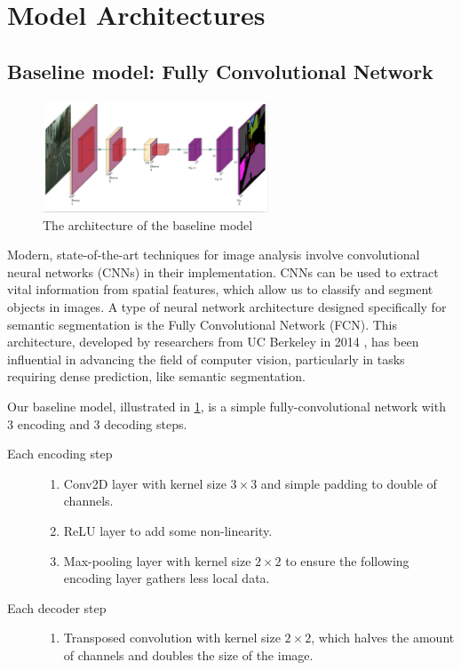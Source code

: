 \section{Model Architectures}
\subsection{Baseline model: Fully Convolutional Network }

\begin{figure}[h]
    \centering 
    \includegraphics[width=0.6\textwidth]{SimpleFCN.png}
    \caption{The architecture of the baseline model}
    \label{baseline_model}
\end{figure}

Modern, state-of-the-art techniques for image analysis involve convolutional neural networks (CNNs) in their implementation. CNNs can be used to extract vital information from spatial features, which allow us to classify and segment objects in images. A type of neural network architecture designed specifically for semantic segmentation is the Fully Convolutional Network (FCN). This architecture, developed by researchers from UC Berkeley in 2014 \cite{DBLP:journals/corr/LongSD14}, has been influential in advancing the field of computer vision, particularly in tasks requiring dense prediction, like semantic segmentation. 

Our baseline model, illustrated in \cref{baseline_model}, is a simple fully-convolutional network with 3 encoding and 3 decoding steps.

\begin{description}
	\item[Each encoding step] \phantom{hello}
		\begin{enumerate}
			\item Conv2D layer with kernel size $3 \times 3$ and simple padding to double of channels.
			\item ReLU layer to add some non-linearity.
			\item Max-pooling layer with kernel size $2 \times 2$ to ensure the following encoding layer gathers less local data.
		\end{enumerate}
	\item[Each decoder step] \phantom{hello}
		\begin{enumerate}
			\item Transposed convolution with kernel size $2 \times 2$, which halves the amount of channels and doubles the size of the image.
		\end{enumerate}
\end{description}

